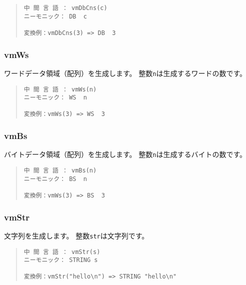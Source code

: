 \begin{quote}
\begin{verbatim}
中 間 言 語 ： vmDbCns(c)
ニーモニック： DB  c   

変換例：vmDbCns(3) => DB  3
\end{verbatim}
\end{quote}

\subsubsection{vmWs}

ワードデータ領域（配列）を生成します。
整数\verb/n/は生成するワードの数です。

\begin{quote}
\begin{verbatim}
中 間 言 語 ： vmWs(n)
ニーモニック： WS  n

変換例：vmWs(3) => WS  3
\end{verbatim}
\end{quote}

\subsubsection{vmBs}

バイトデータ領域（配列）を生成します。
整数\verb/n/は生成するバイトの数です。

\begin{quote}
\begin{verbatim}
中 間 言 語 ： vmBs(n)
ニーモニック： BS  n

変換例：vmWs(3) => BS  3
\end{verbatim}
\end{quote}

\subsubsection{vmStr}

文字列を生成します。
整数\verb/str/は文字列です。

\begin{quote}
\begin{verbatim}
中 間 言 語 ： vmStr(s)
ニーモニック： STRING s

変換例：vmStr("hello\n") => STRING "hello\n"
\end{verbatim}
\end{quote}
